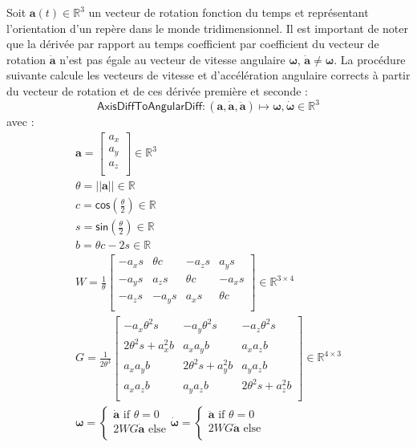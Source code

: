 Soit $\bm{a}(t) \in \mathbb{R}^3$ un vecteur de rotation
fonction du temps et représentant l'orientation d'un repère
dans le monde tridimensionnel.
Il est important de noter que la dérivée par rapport au temps 
coefficient par coefficient du vecteur de rotation $\bm{\dot{a}}$ n'est pas 
égale au vecteur de vitesse angulaire $\bm{\omega}$, $\bm{\dot{a}} \neq \bm{\omega}$.
La procédure suivante calcule les vecteurs de vitesse et d'accélération angulaire
corrects à partir du vecteur de rotation et de ces dérivée première et seconde :
$$
\mathsf{AxisDiffToAngularDiff} : \left(\bm{a}, \bm{\dot{a}}, \bm{\ddot{a}}\right) 
\longmapsto \bm{\omega}, \bm{\dot{\omega}} \in \mathbb{R}^3
$$
avec :
\begin{gather*}
\bm{a} = \begin{bmatrix}
    a_x \\
    a_y \\
    a_z \\
\end{bmatrix}
\in \mathbb{R}^3 \\
\theta  = ||\bm{a}|| \in \mathbb{R} \\
c = \mathsf{cos}\left(\frac{\theta}{2}\right) \in \mathbb{R} \\
s = \mathsf{sin}\left(\frac{\theta}{2}\right) \in \mathbb{R} \\
b = \theta c - 2s \in \mathbb{R} \\
W = \frac{1}{\theta}
\begin{bmatrix}
    -a_xs & \theta c & -a_zs & a_ys \\
    -a_ys & a_zs & \theta c & -a_xs \\
    -a_zs & -a_ys & a_xs & \theta c \\
\end{bmatrix}
\in \mathbb{R}^{3 \times 4} \\
G = \frac{1}{2\theta^3}
\begin{bmatrix}
    -a_x\theta^2s & -a_y\theta^2s & -a_z\theta^2s \\
    2\theta^2s + a_x^2b & a_xa_yb & a_xa_zb \\
    a_xa_yb & 2\theta^2s + a_y^2b & a_ya_zb \\
    a_xa_zb & a_ya_zb & 2\theta^2s + a_z^2b \\
\end{bmatrix}
\in \mathbb{R}^{4 \times 3} \\
\bm{\omega} = 
\begin{cases}
    \bm{\dot{a}} \text{ if }\theta=0\\
    2WG\bm{\dot{a}} \text{ else}\\
\end{cases}
\bm{\dot{\omega}} = 
\begin{cases}
    \bm{\ddot{a}}  \text{ if }\theta=0 \\
    2WG\bm{\ddot{a}}  \text{ else}\\
\end{cases}
\end{gather*}

